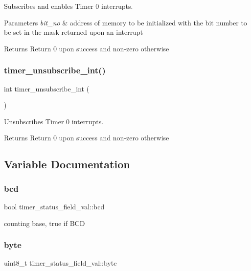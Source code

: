 Subscribes and enables Timer 0 interrupts. 


\begin{DoxyParams}{Parameters}
{\em bit\+\_\+no} & address of memory to be initialized with the bit number to be set in the mask returned upon an interrupt \\
\hline
\end{DoxyParams}
\begin{DoxyReturn}{Returns}
Return 0 upon success and non-\/zero otherwise 
\end{DoxyReturn}
\mbox{\label{group__timer_gab9eea51549744bca5c5c923b388bb4ee}} 
\subsubsection{\texorpdfstring{timer\_unsubscribe\_int()}{timer\_unsubscribe\_int()}}
{\footnotesize\ttfamily int timer\+\_\+unsubscribe\+\_\+int (\begin{DoxyParamCaption}{ }\end{DoxyParamCaption})}



Unsubscribes Timer 0 interrupts. 

\begin{DoxyReturn}{Returns}
Return 0 upon success and non-\/zero otherwise 
\end{DoxyReturn}


\subsection{Variable Documentation}
\mbox{\label{group__timer_gad1c0daae1fe44fc16a05f435123a99f2}} 
\subsubsection{\texorpdfstring{bcd}{bcd}}
{\footnotesize\ttfamily bool timer\+\_\+status\+\_\+field\+\_\+val\+::bcd}

counting base, true if B\+CD \mbox{\label{group__timer_ga37d15361e9d111d7f18f943d85964f51}} 
\subsubsection{\texorpdfstring{byte}{byte}}
{\footnotesize\ttfamily uint8\+\_\+t timer\+\_\+status\+\_\+field\+\_\+val\+::byte}

